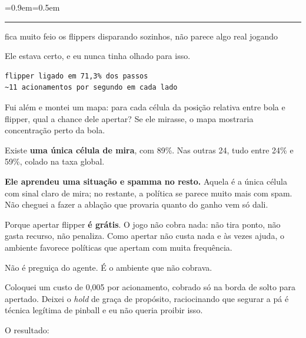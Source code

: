 \documentclass[10pt,a4paper,twoside,twocolumn]{scrartcl}
\renewenvironment{quote}
  {\begin{list}{}{\leftmargin=0.9em\rightmargin=0pt\topsep=0.5em}\item[]%
   \color{destaque}\itshape\small
   \hspace*{-0.9em}\rule[-0.4em]{1.2pt}{1.1em}\hspace{0.5em}\ignorespaces}
  {\end{list}}
\begin{document}
\begin{quote}
fica muito feio os flippers disparando sozinhos, não parece algo real
jogando
\end{quote}

Ele estava certo, e eu nunca tinha olhado para isso.

\begin{verbatim}
flipper ligado em 71,3% dos passos
~11 acionamentos por segundo em cada lado
\end{verbatim}

Fui além e montei um mapa: para cada célula da posição relativa entre
bola e flipper, qual a chance dele apertar? Se ele mirasse, o mapa
mostraria concentração perto da bola.

Existe \textbf{uma única célula de mira}, com 89\%. Nas outras 24, tudo
entre 24\% e 59\%, colado na taxa global.

\textbf{Ele aprendeu uma situação e spamma no resto.} Aquela é a única
célula com sinal claro de mira; no restante, a política se parece muito
mais com spam. Não cheguei a fazer a ablação que provaria quanto do
ganho vem só dali.

Porque apertar flipper \textbf{é grátis}. O jogo não cobra nada: não
tira ponto, não gasta recurso, não penaliza. Como apertar não custa nada
e às vezes ajuda, o ambiente favorece políticas que apertam com muita
frequência.

Não é preguiça do agente. É o ambiente que não cobrava.

Coloquei um custo de 0,005 por acionamento, cobrado só na borda de solto
para apertado. Deixei o \emph{hold} de graça de propósito, raciocinando
que segurar a pá é técnica legítima de pinball e eu não queria proibir
isso.

O resultado:

\vspace{0.2em}
\begin{center}\small
{}
\end{center}
\vspace{0.1em}
\end{document}

